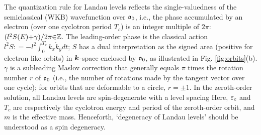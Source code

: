 \documentclass[aps, showpacs, twocolumn, notitlepage, superscriptaddress]{revtex4-1}
\begin{document}
The quantization rule for Landau levels reflects the single-valuedness of the semiclassical (WKB) wavefunction\cite{berry_mount_review} over $\mathfrak{o}_0$, i.e.,  the phase accumulated by an electron (over one cyclotron period $T_c$) is an integer multiple of $2\pi$: $(l^2S(E){+}\gamma)/2\pi{\in}\mathbb{Z}$. The leading-order phase   is the classical action $l^2S{:}{=}{-}l^2\int_{0}^{T_c} k_x \dot{k}_y dt$; $S$ has a dual interpretation as the signed area (positive for electron like orbits) in $\boldsymbol{k}$-space enclosed by $\mathfrak{o}_0$, as illustrated in Fig. \ref{fig:orbits}(b). $\gamma$ is a subleading Maslov correction\cite{keller1958} that generally equals $\pi$ times the rotation number $r$ of $\mathfrak{o}_0$ (i.e., the number of rotations made by the tangent vector over one cycle)\cite{100p}; for orbits that are deformable to a circle,  $r{=}{\pm} 1$. In the zeroth-order  solution, all Landau levels are spin-degenerate with a level spacing 
Here, $\varepsilon_c$ and $T_c$ are respectively the cyclotron energy and period of the zeroth-order orbit, and $m$ is the effective mass. Henceforth, `degeneracy of Landau levels' should be understood as a spin degeneracy. 
\end{document}

